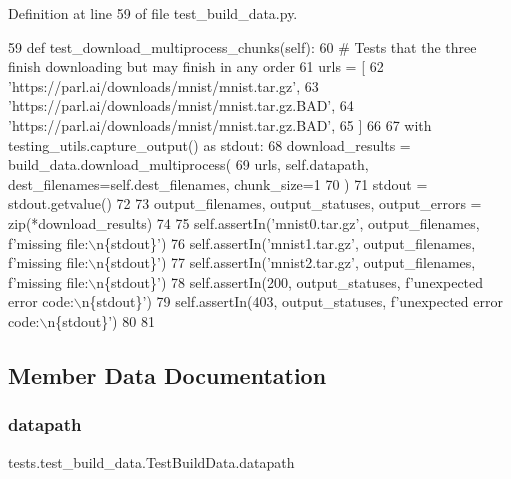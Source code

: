 Definition at line 59 of file test\+\_\+build\+\_\+data.\+py.


\begin{DoxyCode}
59     \textcolor{keyword}{def }test\_download\_multiprocess\_chunks(self):
60         \textcolor{comment}{# Tests that the three finish downloading but may finish in any order}
61         urls = [
62             \textcolor{stringliteral}{'https://parl.ai/downloads/mnist/mnist.tar.gz'},
63             \textcolor{stringliteral}{'https://parl.ai/downloads/mnist/mnist.tar.gz.BAD'},
64             \textcolor{stringliteral}{'https://parl.ai/downloads/mnist/mnist.tar.gz.BAD'},
65         ]
66 
67         with testing\_utils.capture\_output() \textcolor{keyword}{as} stdout:
68             download\_results = build\_data.download\_multiprocess(
69                 urls, self.datapath, dest\_filenames=self.dest\_filenames, chunk\_size=1
70             )
71         stdout = stdout.getvalue()
72 
73         output\_filenames, output\_statuses, output\_errors = zip(*download\_results)
74 
75         self.assertIn(\textcolor{stringliteral}{'mnist0.tar.gz'}, output\_filenames, f\textcolor{stringliteral}{'missing file:\(\backslash\)n\{stdout\}'})
76         self.assertIn(\textcolor{stringliteral}{'mnist1.tar.gz'}, output\_filenames, f\textcolor{stringliteral}{'missing file:\(\backslash\)n\{stdout\}'})
77         self.assertIn(\textcolor{stringliteral}{'mnist2.tar.gz'}, output\_filenames, f\textcolor{stringliteral}{'missing file:\(\backslash\)n\{stdout\}'})
78         self.assertIn(200, output\_statuses, f\textcolor{stringliteral}{'unexpected error code:\(\backslash\)n\{stdout\}'})
79         self.assertIn(403, output\_statuses, f\textcolor{stringliteral}{'unexpected error code:\(\backslash\)n\{stdout\}'})
80 
81 
\end{DoxyCode}


\subsection{Member Data Documentation}
\mbox{\label{classtests_1_1test__build__data_1_1TestBuildData_a4b59ee6d7a834ee32404afe63512db12}} 
\subsubsection{\texorpdfstring{datapath}{datapath}}
{\footnotesize\ttfamily tests.\+test\+\_\+build\+\_\+data.\+Test\+Build\+Data.\+datapath}



